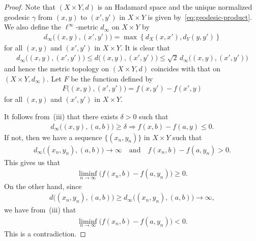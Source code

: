 \documentclass[10pt,a4paper]{amsart}
\begin{document}
\begin{proof}
 Note that $(X\times Y, d)$ is an Hadamard space 
 and the unique normalized geodesic $\gamma$ from $(x,y)$ to $(x',y')$ 
 in $X\times Y$ 
 is given by~\eqref{eq:geodesic-product}. 
 We also define the $\ell^{\infty}$-metric $d_{\infty}$ on $X\times Y$ by 
 \begin{align}
  d_{\infty}\bigl((x,y), (x',y')\bigr)
 =\max\left\{
  d_X(x,x'), d_Y(y,y')
  \right\}
 \end{align}
 for all $(x,y)$ and $(x',y')$ in $X\times Y$. 
 It is clear that 
 \begin{align}
  d_{\infty}\bigl((x,y), (x',y')\bigr)
  \leq d\bigl((x,y), (x',y')\bigr)
  \leq \sqrt{2} \, d_{\infty}\bigl((x,y), (x',y')\bigr)
 \end{align}
 and hence the metric topology on $(X\times Y,d)$ coincides with 
 that on $(X\times Y,d_{\infty})$. 
 Let $F$ be the function defined by 
 \begin{align}%
  F\bigl((x,y), (x',y')\bigr) = f(x, y') - f(x', y)
 \end{align}
 for all $(x,y)$ and $(x',y')$ in $X\times Y$. 

 It follows from~(iii) that there exists $\delta>0$ such that 
 \begin{align}
  d_{\infty}\bigl((x,y), (a,b)\bigr) \geq \delta 
 \Rightarrow 
 f(x, b) - f(a, y) \leq 0. 
 \end{align}
 If not, then 
 we have a sequence $\{(x_n,y_n)\}$ in $X\times Y$ such that 
 \begin{align}
  d_{\infty}\bigl((x_n,y_n),(a,b)\bigr)\to \infty 
  \quad \textrm{and} \quad 
  f(x_n, b) - f(a, y_n) > 0. 
 \end{align}
 This gives us that 
 \begin{align}
  \liminf_{n\to \infty}\bigl(f(x_n, b) - f(a, y_n)\bigr)\geq 0. 
 \end{align}
 On the other hand, since 
 \begin{align}
  d\bigl((x_n,y_n),(a,b)\bigr)
  \geq d_{\infty}\bigl((x_n,y_n),(a,b)\bigr)
  \to \infty, 
 \end{align}
 we have from~(iii) that 
 \begin{align}
  \liminf_{n\to \infty}\bigl(f(x_n, b) - f(a, y_n)\bigr) <0. 
 \end{align}
 This is a contradiction. 


\end{proof}
\end{document}
